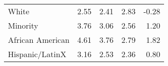 \begin{table}[ht]
\centering
\begin{tabular}{lrrrr}
  \hline
  \hline
White & 2.55 & 2.41 & 2.83 & -0.28 \\ 
  Minority & 3.76 & 3.06 & 2.56 & 1.20 \\ 
  African American & 4.61 & 3.76 & 2.79 & 1.82 \\ 
  Hispanic/LatinX  & 3.16 & 2.53 & 2.36 & 0.80 \\ 
   \hline
\end{tabular}
\end{table}
